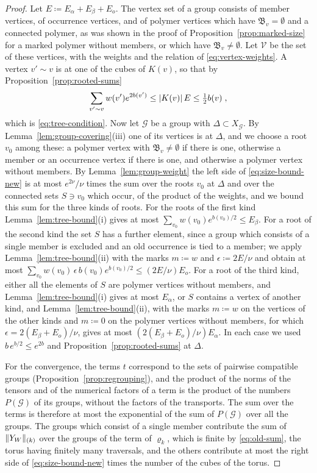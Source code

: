\documentclass[11pt]{preprint}
\DeclarePairedDelimiter{\abs}{\lvert}{\rvert}
\DeclarePairedDelimiter{\norm}{\lVert}{\rVert}
\numberwithin{equation}{section}
\theoremstyle{definition}
\theoremstyle{remark}
\theoremstyle{plain}
\begin{document}
\begin{proof}
Let $E \coloneqq E_\alpha + E_\beta + E_o$. The vertex set of a group consists of member vertices, of occurrence vertices, and of polymer vertices which have $\mathfrak B_v = \emptyset$ and a connected polymer, as was shown in the proof of Proposition~\ref{prop:marked-size} for a marked polymer without members, or which have $\mathfrak B_v \neq \emptyset$. Let $\mathcal V$ be the set of these vertices, with the weights and the relation of \eqref{eq:vertex-weights}. A vertex $v' \sim v$ is at one of the cubes of $K(v)$, so that by Proposition~\ref{prop:rooted-sums}
\[
    \sum_{v' \sim v}w(v')e^{2b(v')} \leq \abs{K(v)}\,E \leq \tfrac12b(v)\;,
\]
which is \eqref{eq:tree-condition}. Now let $\mathcal G$ be a group with $\Delta \subset X_{\mathcal G}$. By Lemma~\ref{lem:group-covering}(iii) one of its vertices is at $\Delta$, and we choose a root $v_0$ among these: a polymer vertex with $\mathfrak B_v \neq \emptyset$ if there is one, otherwise a member or an occurrence vertex if there is one, and otherwise a polymer vertex without members. By Lemma~\ref{lem:group-weight} the left side of \eqref{eq:size-bound-new} is at most $e^{2\nu}/\nu$ times the sum over the roots $v_0$ at $\Delta$ and over the connected sets $S \ni v_0$ which occur, of the product of the weights, and we bound this sum for the three kinds of roots. For the roots of the first kind Lemma~\ref{lem:tree-bound}(i) gives at most $\sum_{v_0}w(v_0)e^{b(v_0)/2} \leq E_\beta$. For a root of the second kind the set $S$ has a further element, since a group which consists of a single member is excluded and an old occurrence is tied to a member; we apply Lemma~\ref{lem:tree-bound}(ii) with the marks $m \coloneqq w$ and $\epsilon \coloneqq 2E/\nu$ and obtain at most $\sum_{v_0}w(v_0)\,\epsilon\,b(v_0)e^{b(v_0)/2} \leq (2E/\nu)E_o$. For a root of the third kind, either all the elements of $S$ are polymer vertices without members, and Lemma~\ref{lem:tree-bound}(i) gives at most $E_\alpha$, or $S$ contains a vertex of another kind, and Lemma~\ref{lem:tree-bound}(ii), with the marks $m \coloneqq w$ on the vertices of the other kinds and $m \coloneqq 0$ on the polymer vertices without members, for which $\epsilon = 2(E_\beta + E_o)/\nu$, gives at most $(2(E_\beta + E_o)/\nu)E_\alpha$. In each case we used $b\,e^{b/2} \leq e^{2b}$ and Proposition~\ref{prop:rooted-sums} at $\Delta$.

For the convergence, the terms $t$ correspond to the sets of pairwise compatible groups (Proposition~\ref{prop:regrouping}), and the product of the norms of the tensors and of the numerical factors of a term is the product of the numbers $P(\mathcal G)$ of its groups, without the factors of the transports. The sum over the terms is therefore at most the exponential of the sum of $P(\mathcal G)$ over all the groups. The groups which consist of a single member contribute the sum of $\norm{Y_W}_{(k)}$ over the groups of the term of $\varrho_k$, which is finite by \eqref{eq:old-sum}, the torus having finitely many traversals, and the others contribute at most the right side of \eqref{eq:size-bound-new} times the number of the cubes of the torus.
\end{proof}
\end{document}
